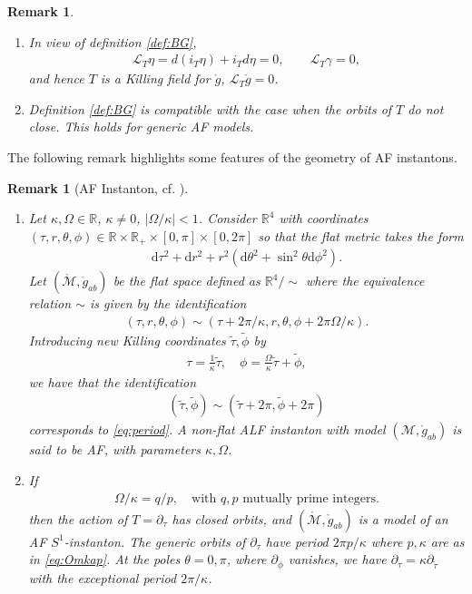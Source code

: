 \documentclass[a4paper,11pt,reqno]{amsart}
\newcommand{\Reals}{\mathbb{R}}
\newcommand{\cM}{\mathcal{M}}
\theoremstyle{plain}
\newtheorem{remark}[thm]{Remark}
\renewcommand{\d}{\mathrm{d}}
\newcommand{\Lie}{\mathcal{L}}
\newcommand{\gring}{\mathring{g}}
\numberwithin{equation}{section}
\begin{document}
\begin{remark} \label{rem:T}
\begin{enumerate} 
\item In view of definition \ref{def:BG},
\begin{align} 
\Lie_T \eta = d(i_T \eta) + i_T d\eta = 0,
\qquad
\Lie_T \gamma = 0,
\end{align} 
and hence $T$ is a Killing field for $\gring$,
$\Lie_T \gring = 0$.
\item 
Definition \ref{def:BG} is compatible with the case when the   orbits of $T$ do not close. This holds for generic AF models. 
\end{enumerate} 
\end{remark} 

The following remark highlights some features of the geometry of AF instantons. 
\begin{remark}[AF Instanton, cf. ] \label{def:AF} 
\begin{enumerate} 
\item 
Let $\kappa, \Omega \in \Reals$, $\kappa \ne 0$, $|\Omega/\kappa| < 1$. Consider $\Reals^4$ with coordinates $(\tau, r, \theta, \phi) \in \Reals \times \Reals_+ \times [0,\pi] \times [0,2\pi]$ so that the flat metric takes the form 
\begin{align} 
\d\tau^2 + \d r^2 + r^2(\d\theta^2 + \sin^2\theta \d\phi^2) .
\end{align} 
Let $(\mathring{\cM}, \mathring{g}_{ab})$ be the flat space defined as $\Reals^4/\sim$ where the equivalence relation $\sim$ is given by the identification 
\begin{align}\label{eq:period} 
(\tau, r,\theta,\phi) \sim (\tau+2\pi/\kappa,r,\theta,\phi + 2\pi\Omega/\kappa) .
\end{align}
Introducing new Killing coordinates $\tilde\tau, \tilde\phi$ by 
\begin{align} 
\tau = \frac{1}{\kappa} \tilde \tau, \quad \phi = \frac{\Omega}{\kappa} \tilde \tau + \tilde \phi , 
\end{align} 
we have that the identification 
\begin{align} \label{eq:tperiod}
(\tilde\tau, \tilde\phi)\sim (\tilde \tau + 2\pi, \tilde \phi + 2\pi) 
\end{align} 
corresponds to \eqref{eq:period}. 
A non-flat ALF instanton with model $(\cM, \mathring{g}_{ab})$ is said to be AF, with parameters $\kappa, \Omega$.
\item If  
\begin{align} \label{eq:Omkap} 
\Omega/\kappa = q/p, \quad \text{with $q,p$ mutually prime integers.}
\end{align} 
then the action of $T = \partial_\tau$ has closed orbits, and $(\mathring{\cM}, \mathring{g}_{ab})$ is a model of an AF $S^1$-instanton. The generic orbits of $\partial_\tau$ have period $2\pi p/\kappa$ where $p,\kappa$ are as in \eqref{eq:Omkap}. At the poles $\theta = 0,\pi$, where $\partial_\phi$ vanishes, we have $\partial_\tau = \kappa \partial_{\tilde \tau}$ with the exceptional period $2\pi/\kappa$. 
\end{enumerate}
\end{remark} 
\end{document}
